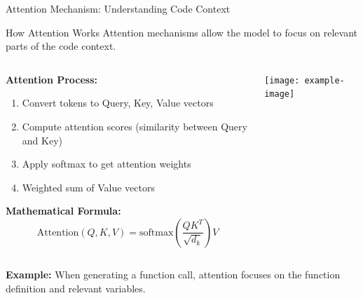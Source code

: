 \documentclass{beamer}
\begin{document}
\begin{frame}[t]{Attention Mechanism: Understanding Code Context}
    \begin{block}{How Attention Works}
        Attention mechanisms allow the model to focus on relevant parts of the code context.
    \end{block}
    
    \begin{columns}[t]
        \begin{column}{0.6\textwidth}
            \textbf{Attention Process:}
            \begin{enumerate}
                \item Convert tokens to Query, Key, Value vectors
                \item Compute attention scores (similarity between Query and Key)
                \item Apply softmax to get attention weights
                \item Weighted sum of Value vectors
            \end{enumerate}
            
            \textbf{Mathematical Formula:}
            \[
            \text{Attention}(Q, K, V) = \text{softmax}\left(\frac{QK^T}{\sqrt{d_k}}\right)V
            \]
        \end{column}
        \begin{column}{0.4\textwidth}
            \centering
            \texttt{[image: example-image]} %
        \end{column}
    \end{columns}
    
    \textbf{Example:} When generating a function call, attention focuses on the function definition and relevant variables.
\end{frame}
\end{document}
